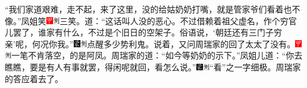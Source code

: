 “我们家道艰难，走不起，来了这里，没的给姑奶奶打嘴，就是管家爷们看着也不像。”凤姐笑{\includegraphics[width=3mm]{../Images/00002}\includegraphics[width=3mm]{../Images/00011}\footnotesize \kaishu 三笑。}道：“这话叫人没的恶心。不过借赖着祖父虚名，作个穷官儿罢了，谁家有什么，不过是个旧日的空架子。俗语说，‘朝廷还有三门子穷亲’呢，何况你我。”{\includegraphics[width=3mm]{../Images/00006}\includegraphics[width=3mm]{../Images/00011}\footnotesize \kaishu 点醒多少势利鬼。}说着，又问周瑞家的回了太太了没有。{\includegraphics[width=3mm]{../Images/00002}\includegraphics[width=3mm]{../Images/00011}\footnotesize \kaishu 一笔不肯落空，的是阿凤。}周瑞家的道：“如今等奶奶的示下。”凤姐儿道：“你去瞧瞧，要是有人有事就罢，得闲呢就回，看怎么说。”{\includegraphics[width=3mm]{../Images/00006}\includegraphics[width=3mm]{../Images/00011}\footnotesize \kaishu “看”之一字细极。}周瑞家的答应着去了。

